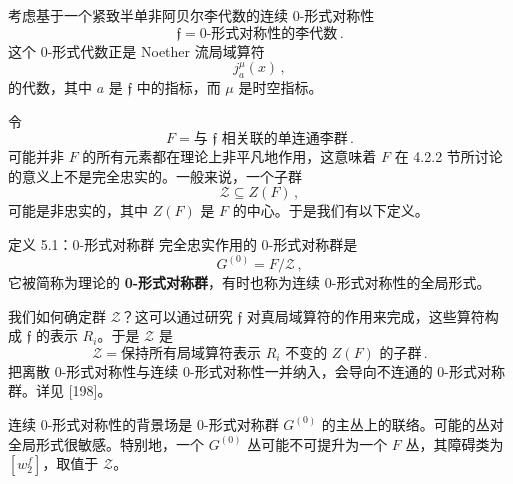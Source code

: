 考虑基于一个紧致半单非阿贝尔李代数的连续 0-形式对称性
\begin{equation}
  \mathfrak{f}=\text{0-形式对称性的李代数}\,. \tag{5.40}
\end{equation}
这个 0-形式代数正是 Noether 流局域算符
\begin{equation}
  j^\mu_a(x)\,, \tag{5.41}
\end{equation}
的代数，其中 $a$ 是 $\mathfrak{f}$ 中的指标，而 $\mu$ 是时空指标。

令
\begin{equation}
  F=\text{与 }\mathfrak{f}\text{ 相关联的单连通李群}\,. \tag{5.42}
\end{equation}
可能并非 $F$ 的所有元素都在理论上非平凡地作用，这意味着 $F$ 在 4.2.2 节所讨论的意义上不是完全忠实的。一般来说，一个子群
\begin{equation}
  \mathcal{Z}\subseteq Z(F)\,, \tag{5.43}
\end{equation}
可能是非忠实的，其中 $Z(F)$ 是 $F$ 的中心。于是我们有以下定义。

\begin{definitionbox}{定义 5.1：0-形式对称群}
完全忠实作用的 0-形式对称群是
\begin{equation}
  G^{(0)}=F/\mathcal{Z}\,, \tag{5.44}
\end{equation}
它被简称为理论的 \textbf{0-形式对称群}，有时也称为连续 0-形式对称性的全局形式。
\end{definitionbox}

我们如何确定群 $\mathcal{Z}$？这可以通过研究 $\mathfrak{f}$ 对真局域算符的作用来完成，这些算符构成 $\mathfrak{f}$ 的表示 $R_i$。于是 $\mathcal{Z}$ 是
\begin{equation}
  \mathcal{Z}=\text{保持所有局域算符表示 }R_i\text{ 不变的 }Z(F)\text{ 的子群}\,. \tag{5.45}
\end{equation}
把离散 0-形式对称性与连续 0-形式对称性一并纳入，会导向不连通的 0-形式对称群。详见 [198]。


连续 0-形式对称性的背景场是 0-形式对称群 $G^{(0)}$ 的主丛上的联络。可能的丛对全局形式很敏感。特别地，一个 $G^{(0)}$ 丛可能不可提升为一个 $F$ 丛，其障碍类为 $\left[w_2^f\right]$，取值于 $\mathcal{Z}$。

